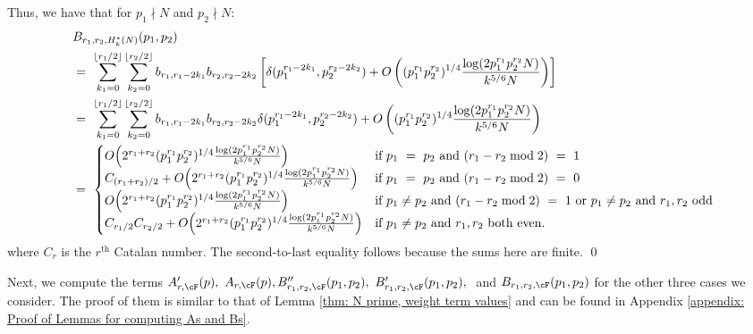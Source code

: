 \documentclass[11pt, reqno]{amsart}
\theoremstyle{definition}
\theoremstyle{remark}
\numberwithin{equation}{section}
\begin{document}
Thus, we have that for $p_1 \nmid N$ and $p_2 \nmid N:$ 
\footnotesize\begin{align}
   & B_{r_1,r_2,H_k^*(N)}(p_1,p_2)\\
 \notag \  &=\ \sum_{k_1=0}^{\lfloor r_1/2\rfloor}\sum_{k_2=0}^{\lfloor r_2/2\rfloor} b_{r_1,r_1-2k_1}b_{r_2,r_2-2k_2} \left[\delta(p_1^{r_1-2k_1},p_2^{r_2-2k_2}) + O\left((p_1^{r_1}p_2^{r_2})^{1/4}\frac{\log(2p_1^{r_1}p_2^{r_2}N)}{k^{5/6}N}\right)\right] \notag \\
    &=\ \sum_{k_1=0}^{\lfloor r_1/2\rfloor}\sum_{k_2=0}^{\lfloor r_2/2\rfloor} b_{r_1,r_1-2k_1}b_{r_2,r_2-2k_2} \delta(p_1^{r_1-2k_1},p_2^{r_2-2k_2}) + O\left((p_1^{r_1}p_2^{r_2})^{1/4}\frac{\log(2p_1^{r_1}p_2^{r_2}N)}{k^{5/6}N}\right) \notag \\
    &=\ \begin{cases}
  O\!\left(2^{r_1+r_2}(p_1^{r_1}p_2^{r_2})^{1/4} 
    \frac{\log(2p_1^{r_1}p_2^{r_2}N)}{k^{5/6}N}\right) 
    & \text{if $p_1\ =\ p_2$ and $(r_1 - r_2 \bmod 2)\ =\ 1$} \\[2pt]
    C_{(r_1+r_2)/2} 
    + O\!\left(2^{r_1+r_2}(p_1^{r_1}p_2^{r_2})^{1/4} 
    \frac{\log(2p_1^{r_1}p_2^{r_2}N)}{k^{5/6}N}\right) 
    & \text{if $p_1\  =\ p_2$ and $(r_1 - r_2 \bmod 2)\ = \ 0$} \\[2pt]
  O\!\left(2^{r_1+r_2}(p_1^{r_1}p_2^{r_2})^{1/4} 
    \frac{\log(2p_1^{r_1}p_2^{r_2}N)}{k^{5/6}N}\right) 
    & \text{if $p_1 \neq p_2$ and $(r_1 - r_2 \bmod 2)\ =\ 1$ 
      or $p_1 \neq p_2$ and $r_1,r_2$ odd} \\[2pt]
  C_{r_1/2} C_{r_2/2} 
    + O\!\left(2^{r_1+r_2}(p_1^{r_1}p_2^{r_2})^{1/4} 
    \frac{\log(2p_1^{r_1}p_2^{r_2}N)}{k^{5/6}N}\right) 
    & \text{if $p_1 \neq p_2$ and $r_1,r_2$ both even.}
\end{cases}
\end{align}\normalsize where $C_{r}$ is the $r^{\text{th}}$ Catalan number. 
The second-to-last equality follows because the sums here are finite. \qed

Next, we compute the terms $A'_{r,\cF}(p), \ A_{r,\cF}(p), B''_{r_1,r_2,\cF}(p_1,p_2), \ B'_{r_1,r_2,\cF}(p_1,p_2), \ $ and $B_{r_1,r_2,\cF}(p_1,p_2)$ for the other three cases we consider. The proof of them is similar to that of Lemma \ref{thm: N prime, weight term values} and can be found in Appendix \ref{appendix: Proof of Lemmas for computing As and Bs}.
\end{document}
